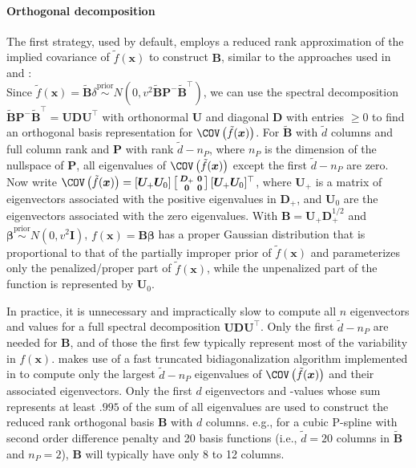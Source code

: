 \documentclass[article, shortnames, nojss, noheadings, notitle]{jss}
\newcommand{\priorsim}{\stackrel{\text{prior}}{\sim}}
\begin{document}
\paragraph*{Orthogonal decomposition}
The first strategy, used by default,
employs a reduced rank approximation of the implied covariance of $\tilde f(\bm x)$
to construct $\bm B$, similar to the approaches used in \citet{Reich:Storlie:Bondell:2009} and \citet{Cottet:Kohn:Nott:2008}:\\
Since $\tilde f(\bm x) =  \bm{\tilde{B}}\delta \priorsim N(0, v^2 \bm{\tilde{B}P^-\tilde{B}^\top})$,
we can use the spectral decomposition $\bm{\tilde{B}P^-\tilde{B}^\top}= \bm{UDU}^\top$
with orthonormal $\bm U$ and diagonal $\bm D$  with entries $\geq 0$ to find an orthogonal basis
representation for $\COV\left( \tilde f(\bm x)\right)$. For $\bm{\tilde{B}}$
with $\tilde d$ columns and full column rank and $\bm P$ with rank $\tilde d - n_P$, where $n_P$ is the dimension
of the nullspace of $\bm P$, all eigenvalues of $\COV\left(\tilde f(\bm x)\right)$ except the first $\tilde d - n_P$
are zero. Now write $\COV\left(\tilde f(\bm x)\right) = [\bm U_+  \bm U_0] \left[\begin{smallmatrix}  \bm D_+ & \bm 0 \\ \bm
 0 & \bm 0\end{smallmatrix}\right] [\bm U_+  \bm U_0]^\top$, where $\bm U_+$ is a matrix of eigenvectors associated
with the positive eigenvalues in $\bm D_+$, and $\bm U_0$ are the eigenvectors associated with the zero eigenvalues.
With $\bm B = \bm U_+ \bm D_+^{1/2}$ and $\bm\beta \priorsim N(0, v^2 \bm I)$, $f(\bm x)= \bm{ B  \beta}$
has a proper Gaussian distribution that is proportional to that of the partially improper prior of $\tilde f(\bm x)$ \citep[][eq. (3.16)]{Rue:Held:2005}
and parameterizes only the penalized/proper part of $\tilde f(\bm x)$, while the unpenalized part of the function is represented
by $\bm U_0$.

In practice, it is unnecessary and impractically slow to compute all $n$ eigenvectors and values
for a full spectral decomposition $\bm{UDU}^\top$.
Only the first $\tilde d - n_P$ are needed for $\bm B$, and of those the first few typically represent
most of the variability in $f(\bm x)$.
 makes use of a fast truncated bidiagonalization algorithm \citep{Baglama:Reichel:2006}
implemented in  \citep{irlba} to compute only the largest $\tilde d - n_P$ eigenvalues
of $\COV\left(\tilde f(\bm x)\right)$ and their associated eigenvectors. Only the first
$d$ eigenvectors and -values whose
sum represents at least $.995$ of the sum of all eigenvalues
are used to construct the reduced rank orthogonal basis $\bm B$ with $d$ columns.
e.g., for a cubic P-spline with second order difference penalty and 20 basis functions
(i.e., $\tilde d = 20$ columns in $\bm{\tilde{B}}$ and $n_P=2$),
$\bm B$ will typically have only 8 to 12 columns.
\end{document}

